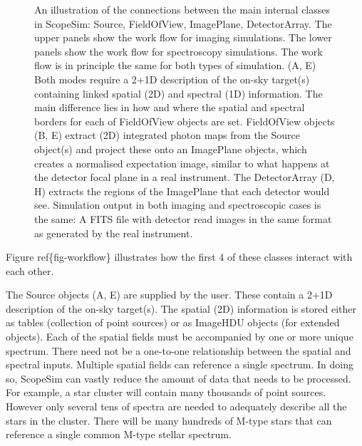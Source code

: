\begin{figure}[H]
\noindent{}\label{fig-workflow}

\caption{An illustration of the connections between the main internal classes in ScopeSim: Source, FieldOfView, ImagePlane, DetectorArray.
The upper panels show the work flow for imaging simulations.
The lower panels show the work flow for spectroscopy simulations.
The work flow is in principle the same for both types of simulation.
(A, E) Both modes require a 2+1D description of the on-sky target(s) containing linked spatial (2D) and spectral (1D) information.
The main difference lies in how and where the spatial and spectral borders for each of FieldOfView objects are set.
FieldOfView objects (B, E) extract (2D) integrated photon maps from the Source object(s) and project these onto an ImagePlane objects, which creates a normalised expectation image, similar to what happens at the detector focal plane in a real instrument.
The DetectorArray (D, H) extracts the regions of the ImagePlane that each detector would see.
Simulation output in both imaging and spectroscopic cases is the same: A FITS file with detector read images in the same format as generated by the real instrument.}
\end{figure}

Figure ref\{fig-workflow\} illustrates how the first 4 of these classes interact with each other.

The Source objects (A, E) are supplied by the user.
These contain a 2+1D description of the on-sky target(s).
The spatial (2D) information is stored either as tables (collection of point sources) or as ImageHDU objects (for extended objects).
Each of the spatial \textquotedbl{}fields\textquotedbl{} must be accompanied by one or more unique spectrum.
There need not be a one-to-one relationship between the spatial and spectral inputs.
Multiple spatial fields can reference a single spectrum.
In doing so, ScopeSim can vastly reduce the amount of data that needs to be processed.
For example, a star cluster will contain many thousands of point sources.
However only several tens of spectra are needed to adequately describe all the stars in the cluster.
There will be many hundreds of M-type stars that can reference a single common M-type stellar spectrum.

